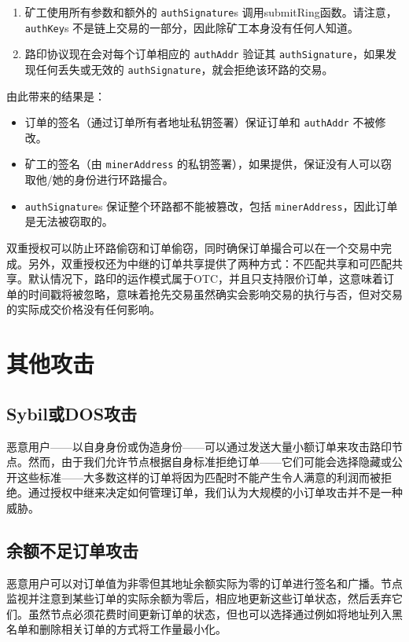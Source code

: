 \documentclass[UTF8]{ctexart}
\begin{document}
\begin{multicols}{2}
\begin{enumerate}
	\item 矿工使用所有参数和额外的 \verb|authSignature|s 调用submitRing函数。请注意，\verb|authKey|s 不是链上交易的一部分，因此除矿工本身没有任何人知道。

	\item 路印协议现在会对每个订单相应的 \verb|authAddr| 验证其 \verb|authSignature|，如果发现任何丢失或无效的 \verb|authSignature|，就会拒绝该环路的交易。
 
\end{enumerate}

由此带来的结果是：

\begin{itemize}

	\item  订单的签名（通过订单所有者地址私钥签署）保证订单和 \verb|authAddr| 不被修改。
	\item  矿工的签名（由 \verb|minerAddress| 的私钥签署），如果提供，保证没有人可以窃取他/她的身份进行环路撮合。
	\item  \verb|authSignature|s 保证整个环路都不能被篡改，包括 \verb|minerAddress|，因此订单是无法被窃取的。

\end{itemize}

双重授权可以防止环路偷窃和订单偷窃，同时确保订单撮合可以在一个交易中完成。另外，双重授权还为中继的订单共享提供了两种方式：不匹配共享和可匹配共享。默认情况下，路印的运作模式属于OTC，并且只支持限价订单，这意味着订单的时间戳将被忽略，意味着抢先交易虽然确实会影响交易的执行与否，但对交易的实际成交价格没有任何影响。

\section{其他攻击}

\subsection{Sybil或DOS攻击}
恶意用户——以自身身份或伪造身份——可以通过发送大量小额订单来攻击路印节点。然而，由于我们允许节点根据自身标准拒绝订单——它们可能会选择隐藏或公开这些标准——大多数这样的订单将因为匹配时不能产生令人满意的利润而被拒绝。通过授权中继来决定如何管理订单，我们认为大规模的小订单攻击并不是一种威胁。

\subsection{余额不足订单攻击}
恶意用户可以对订单值为非零但其地址余额实际为零的订单进行签名和广播。节点监视并注意到某些订单的实际余额为零后，相应地更新这些订单状态，然后丢弃它们。虽然节点必须花费时间更新订单的状态，但也可以选择通过例如将地址列入黑名单和删除相关订单的方式将工作量最小化。


\end{multicols}
\end{document}
